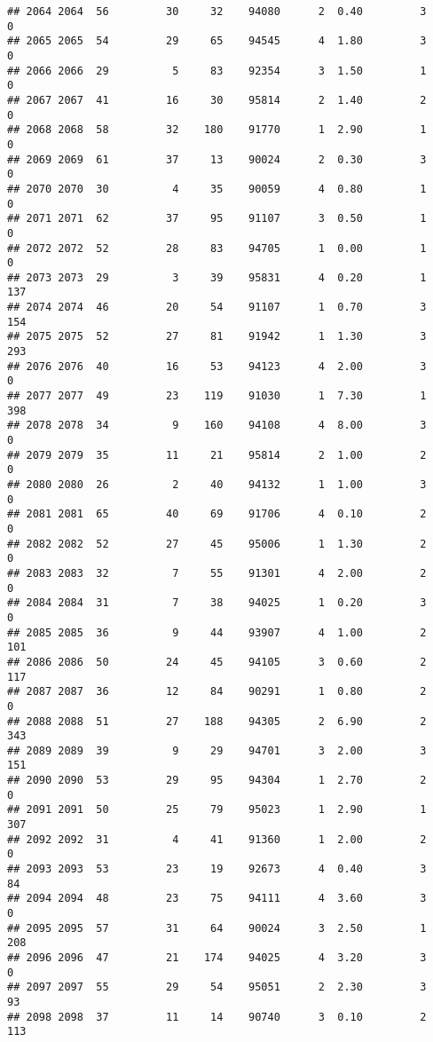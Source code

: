 \documentclass[
]{article}
\begin{document}
\begin{verbatim}
## 2064 2064  56         30     32    94080      2  0.40         3        0
## 2065 2065  54         29     65    94545      4  1.80         3        0
## 2066 2066  29          5     83    92354      3  1.50         1        0
## 2067 2067  41         16     30    95814      2  1.40         2        0
## 2068 2068  58         32    180    91770      1  2.90         1        0
## 2069 2069  61         37     13    90024      2  0.30         3        0
## 2070 2070  30          4     35    90059      4  0.80         1        0
## 2071 2071  62         37     95    91107      3  0.50         1        0
## 2072 2072  52         28     83    94705      1  0.00         1        0
## 2073 2073  29          3     39    95831      4  0.20         1      137
## 2074 2074  46         20     54    91107      1  0.70         3      154
## 2075 2075  52         27     81    91942      1  1.30         3      293
## 2076 2076  40         16     53    94123      4  2.00         3        0
## 2077 2077  49         23    119    91030      1  7.30         1      398
## 2078 2078  34          9    160    94108      4  8.00         3        0
## 2079 2079  35         11     21    95814      2  1.00         2        0
## 2080 2080  26          2     40    94132      1  1.00         3        0
## 2081 2081  65         40     69    91706      4  0.10         2        0
## 2082 2082  52         27     45    95006      1  1.30         2        0
## 2083 2083  32          7     55    91301      4  2.00         2        0
## 2084 2084  31          7     38    94025      1  0.20         3        0
## 2085 2085  36          9     44    93907      4  1.00         2      101
## 2086 2086  50         24     45    94105      3  0.60         2      117
## 2087 2087  36         12     84    90291      1  0.80         2        0
## 2088 2088  51         27    188    94305      2  6.90         2      343
## 2089 2089  39          9     29    94701      3  2.00         3      151
## 2090 2090  53         29     95    94304      1  2.70         2        0
## 2091 2091  50         25     79    95023      1  2.90         1      307
## 2092 2092  31          4     41    91360      1  2.00         2        0
## 2093 2093  53         23     19    92673      4  0.40         3       84
## 2094 2094  48         23     75    94111      4  3.60         3        0
## 2095 2095  57         31     64    90024      3  2.50         1      208
## 2096 2096  47         21    174    94025      4  3.20         3        0
## 2097 2097  55         29     54    95051      2  2.30         3       93
## 2098 2098  37         11     14    90740      3  0.10         2      113

\end{verbatim}
\end{document}
